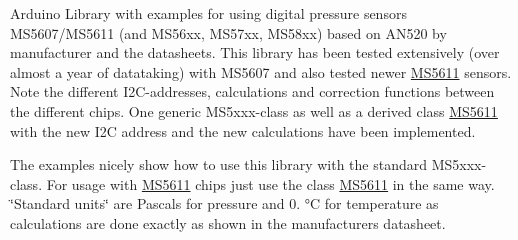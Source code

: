 Arduino Library with examples for using digital pressure sensors M\+S5607/\+M\+S5611 (and M\+S56xx, M\+S57xx, M\+S58xx) based on A\+N520 by manufacturer and the datasheets. This library has been tested extensively (over almost a year of datataking) with M\+S5607 and also tested newer \hyperlink{class_m_s5611}{M\+S5611} sensors. Note the different I2\+C-\/addresses, calculations and correction functions between the different chips. One generic M\+S5xxx-\/class as well as a derived class \hyperlink{class_m_s5611}{M\+S5611} with the new I2C address and the new calculations have been implemented.

The examples nicely show how to use this library with the standard M\+S5xxx-\/class. For usage with \hyperlink{class_m_s5611}{M\+S5611} chips just use the class \hyperlink{class_m_s5611}{M\+S5611} in the same way. \char`\"{}\+Standard units\char`\"{} are Pascals for pressure and 0. °C for temperature as calculations are done exactly as shown in the manufacturers datasheet.

\href{http://dx.doi.org/10.5281/zenodo.47085}{\tt } 